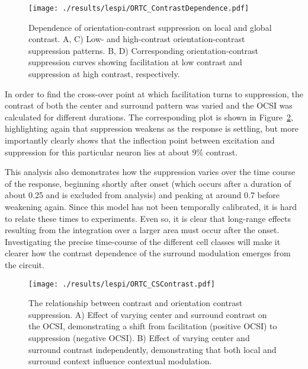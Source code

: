 \begin{figure}
	\centering
        \texttt{[image: ./results/lespi/ORTC\_ContrastDependence.pdf]}
	\caption[Dependence of orientation-contrast suppression on local
      and global contrast.]{Dependence of orientation-contrast
      suppression on local and global contrast. A, C) Low- and
      high-contrast orientation-contrast suppression patterns. B, D)
      Corresponding orientation-contrast suppression curves showing
      facilitation at low contrast and suppression at high contrast,
      respectively.}
	\label{ORTC_ContrastDependence}
\end{figure}


In order to find the cross-over point at which facilitation turns to
suppression, the contrast of both the center and surround pattern was
varied and the OCSI was calculated for different durations. The
corresponding plot is shown in Figure~\ref{ORTC_ContrastCurve},
highlighting again that suppression weakens as the response is
settling, but more importantly clearly shows that the inflection point between
excitation and suppression for this particular neuron lies at about
9\% contrast.

This analysis also demonstrates how the suppression varies over the
time course of the response, beginning shortly after onset (which
occurs after a duration of about 0.25 and is excluded from analysis)
and peaking at around 0.7 before weakening again. Since this model has
not been temporally calibrated, it is hard to relate these times to
experiments.  Even so, it is clear that long-range effects resulting from
the integration over a larger area must occur after the
onset. Investigating the precise time-course of the different cell
classes will make it clearer how the contrast dependence of the
surround modulation emerges from the circuit.

\begin{figure}
	\centering
        \texttt{[image: ./results/lespi/ORTC\_CSContrast.pdf]}
	\caption[Contrast dependent switch from facilitation to
      suppression.]{The relationship between contrast and orientation
      contrast suppression. A) Effect of varying center and surround
      contrast on the OCSI, demonstrating a shift from facilitation
      (positive OCSI) to suppression (negative OCSI). B) Effect of
      varying center and surround contrast independently, demonstrating
      that both local and surround context influence contextual
      modulation.}
	\label{ORTC_ContrastCurve}
\end{figure}



